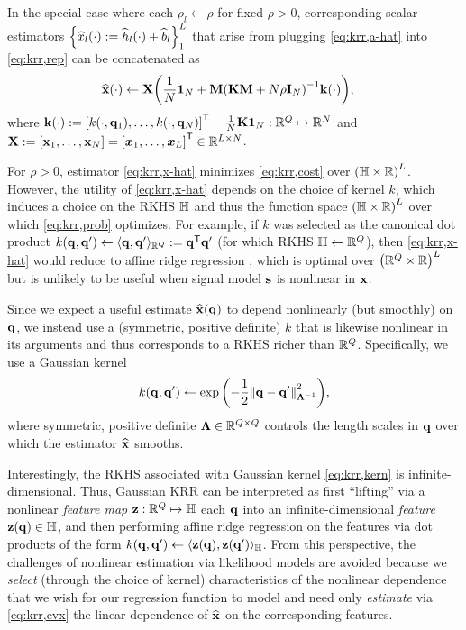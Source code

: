 In the special case where each
$\rho_l \gets \rho$ 
for fixed $\rho>0$, 
corresponding scalar estimators 
$\set{\est{x}_l\paren{\cdot} := \est{h}_l\paren{\cdot} + \est{b}_l}_1^L$
that arise from plugging \eqref{eq:krr,a-hat} into \eqref{eq:krr,rep}
can be concatenated as
\begin{align}
	\bmxha{\cdot} &\gets \bmX 
		\paren{\frac{1}{N}\ones{N} + 
		\bmM\inv{\bmK\bmM + N\rho\eye{N}} \bmka{\cdot}},
		\label{eq:krr,x-hat}
\end{align}
where
$\bmka{\cdot} := 
\brac{k(\cdot,\bmq_1),\dots,k(\cdot,\bmq_N)}\tpose - \frac{1}{N}\bmK\ones{N}
: \reals{Q} \mapsto \reals{N}$
and 
$\bmX := \brac{\bmx_1,\dots,\bmx_N} = \brac{\bmxg{1},\dots,\bmxg{L}}\tpose 
\in \reals{L \times N}$.

For $\rho>0$, 
estimator \eqref{eq:krr,x-hat} minimizes \eqref{eq:krr,cost}
over $\paren{\hilb \times \real}^L$.
However, the utility of \eqref{eq:krr,x-hat}
depends on the choice of kernel $k$,
which induces a choice on the RKHS $\mathbb{H}$
and thus the function space $\paren{\hilb \times \real}^L$
over which \eqref{eq:krr,prob} optimizes.
For example, if $k$ was selected as the canonical dot product 
$k(\mathbf{q},\mathbf{q}') \gets \langle \mathbf{q},\mathbf{q}' \rangle_{\mathbb{R}^{Q}} := \mathbf{q}^{\mathsf{T}} \mathbf{q}'$
(for which RKHS $\mathbb{H} \gets \mathbb{R}^{Q}$),
then \eqref{eq:krr,x-hat} would reduce 
to affine ridge regression \cite{hoerl:70:rrb},
which is optimal over $\paren{\reals{Q} \times \real}^L$
but is unlikely to be useful when signal model $\mathbf{s}$ is nonlinear in $\mathbf{x}$.

Since we expect a useful estimate $\est{\bmx}\paren{\bmq}$ 
to depend nonlinearly (but smoothly) on $\mathbf{q}$,
we instead use a 
(symmetric, positive definite) 
$k$ that is likewise nonlinear in its arguments
and thus corresponds to a RKHS richer than $\mathbb{R}^{Q}$. 
Specifically, we use a Gaussian kernel
\begin{align}
	k(\bmq,\bmq') \gets \expa{-\frac{1}{2}\norm{\bmq-\bmq'}^2_{\bmL^{-1}}},
	\label{eq:krr,kern}
\end{align}
where symmetric, positive definite 
$\boldsymbol{\Lambda} \in \mathbb{R}^{Q \times Q}$ 
controls the length scales in $\mathbf{q}$ over which 
the estimator $\widehat{\mathbf{x}}$ smooths.

Interestingly, 
the RKHS associated 
with Gaussian kernel \eqref{eq:krr,kern}
is infinite-dimensional.
Thus, 
Gaussian KRR
can be interpreted as 
first ``lifting'' 
via a nonlinear \emph{feature map} 
$\mathbf{z} : \mathbb{R}^{Q} \mapsto \mathbb{H}$ 
each $\mathbf{q}$ 
into an infinite-dimensional \emph{feature} $\bmza{\bmq} \in \hilb$,
and then performing affine ridge regression
on the features
via dot products of the form
$k(\bmq,\bmq') \gets \innprod{\bmza{\bmq}}{\bmza{\bmq'}}_{\hilb}$.
From this perspective,
the challenges of nonlinear estimation 
via likelihood models
are avoided 
because we \emph{select} 
(through the choice of kernel) 
characteristics of the nonlinear dependence
that we wish 
for our regression function to model
and need only \emph{estimate} via \eqref{eq:krr,cvx} 
the linear dependence
of $\widehat{\mathbf{x}}$ on the corresponding features.


